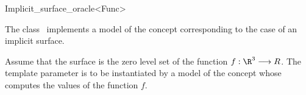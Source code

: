 

\begin{ccRefClass}{Implicit_surface_oracle<Func>}  %


\ccDefinition
  
The class \ccRefName\  implements a model of the concept
 corresponding to the case
of an implicit surface. 

Assume that the  surface is
the zero level set of the function
$f : \R^3 \longrightarrow R$. The template parameter
  is to be instantiated by a model of the concept
 whose  computes the values 
of the function $f$.


\ccIsModel








\ccSeeAlso







\end{ccRefClass}



